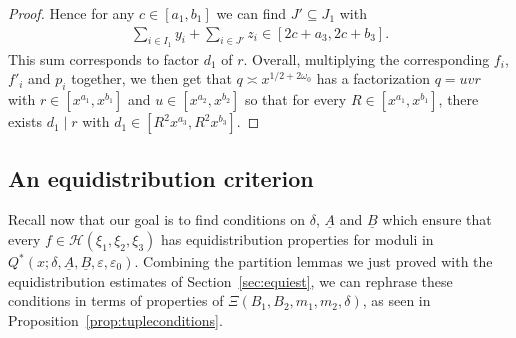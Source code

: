 \documentclass{amsart}
\numberwithin{equation}{section}
\begin{document}
\begin{proof}
Hence for any $c \in [a_1,b_1]$ we can find $J' \subseteq J_1$ with 
\begin{align*}
\sum_{i \in I_1}   y_i +  \sum_{i \in J'} z_i  \in [2c+a_3,2c+b_3].
\end{align*}
This sum corresponds to factor $d_1$ of $r$. Overall, multiplying the corresponding $f_i$, $f'_i$ and $p_i$ together, we then get that $q \asymp x^{1/2+2\omega_0}$ has a factorization  $q=uvr$ with   $r \in [x^{a_1},x^{b_1}]$ and $u \in [x^{a_2},x^{b_2}]$ so that  for every $R \in   [x^{a_1},x^{b_1}]$, there exists $d_1 \mid r$ with $d_1 \in [R^2x^{a_3},R^2x^{b_3}]$. 
\end{proof}

\subsection{An equidistribution criterion} 

Recall now that our goal is to find conditions on $\delta$, $\underline{A}$ and $\underline{B}$ which ensure that every $f \in \mathcal{H}(\xi_1, \xi_2,\xi_3)$  has equidistribution properties for moduli in $Q^*(x;\delta,\underline{A},\underline{B},\varepsilon,\varepsilon_0)$.  Combining the partition lemmas we just proved with the equidistribution estimates of Section~\ref{sec:equiest}, we can rephrase these conditions in terms of properties of $\Xi(B_1,B_2,m_1,m_2,\delta)$, as seen in Proposition~\ref{prop:tupleconditions}.
\end{document}
